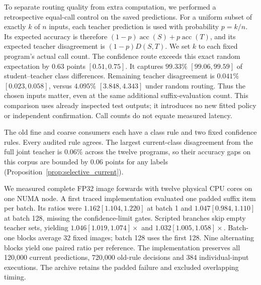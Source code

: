 To separate routing quality from extra computation, we performed a
retrospective equal-call control on the saved predictions. For a uniform
subset of exactly $k$ of $n$ inputs, each teacher prediction is used with
probability $p=k/n$. Its expected accuracy is therefore
$(1-p)\operatorname{acc}(S)+p\operatorname{acc}(T)$, and its expected
teacher disagreement is $(1-p)D(S,T)$. We set $k$ to each fixed program's
actual call count. The confidence route exceeds this exact random
expectation by $0.63$ points $[0.51,0.75]$. It captures $99.33\%$
$[99.06,99.59]$ of student--teacher class differences. Remaining teacher
disagreement is $0.041\%$ $[0.023,0.058]$, versus $4.095\%$
$[3.848,4.343]$ under random routing. Thus the chosen inputs matter,
even at the same additional suffix-evaluation count. This comparison
uses already inspected test outputs; it introduces no new fitted policy
or independent confirmation. Call counts do not equate measured latency.

The old fine and coarse consumers each have a class rule and two fixed
confidence rules. Every audited rule agrees. The largest current-class
disagreement from the full joint teacher is $0.06\%$ across
the twelve programs, so their accuracy gaps on this corpus are bounded
by $0.06$ points for any labels
(Proposition~\ref{prop:selective_current}).

We measured complete FP32 image forwards with twelve physical CPU
cores on one NUMA node. A first traced implementation evaluated one
padded suffix item per batch. Its ratios were $1.162 [1.104, 1.220]$ at batch 1
and $1.047 [0.984, 1.110]$ at batch 128, missing the confidence-limit gates.
Scripted branches skip empty teacher sets, yielding
$1.046 [1.019, 1.074]\times$ and $1.032 [1.005, 1.058]\times$.
Batch-one blocks average 32 fixed images; batch 128 uses the first 128.
Nine alternating blocks yield one paired ratio per reference.
The implementation preserves all 120,000 current predictions,
720,000 old-rule decisions and 384 individual-input executions.
The archive retains the padded failure and excluded overlapping timing.
